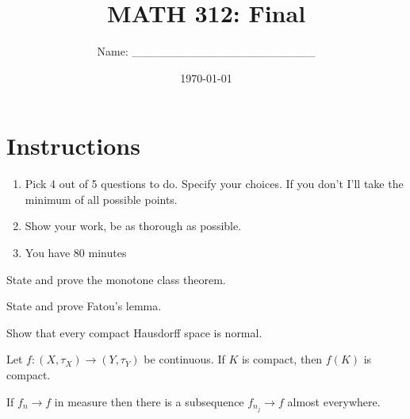 \documentclass[12pt]{amsart}
\title{ MATH 312: Final}
\author{Name: \_\_\_\_\_\_\_\_\_\_\_\_\_\_\_\_\_\_\_\_\_\_}
\date{\today}
\begin{document}
\maketitle


\section*{Instructions}

\begin{enumerate}
	\item Pick 4 out of 5 questions to do. Specify your choices. If you don't I'll take the minimum of all possible points.
	\item Show your work, be as thorough as possible.
	\item You have 80 minutes
\end{enumerate}


\newpage

\begin{question}
	State and prove the monotone class theorem.
\end{question}

\begin{question}
	State and prove Fatou's lemma.
\end{question}


\begin{question}
	Show that every compact Hausdorff space is normal.
\end{question}


\begin{question}
	Let $f: (X, \tau_X) \to (Y, \tau_Y)$ be continuous.
	If $K$ is compact, then $f(K)$ is compact.
\end{question}

\begin{question}
	If $f_n \to f$ in measure then there is a subsequence $f_{n_j} \to f$ almost everywhere.
\end{question}
\end{document}
